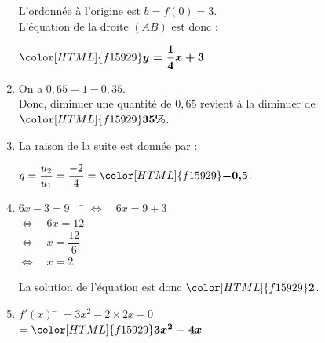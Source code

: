 \documentclass[a4paper,11pt,landscape,exos]{nsi} %
\begin{document}
\begin{multicols}{2}
\begin{enumerate}[]
\medskip
L'ordonnée à l'origine est $b=f(0)=3$.\\
L'équation de la droite $(AB)$ est donc :
\begin{center}
    $\color[HTML]{f15929}\boldsymbol{y=\dfrac{1}{4}x+3}$.
\end{center}
\item On a $0{,}65=1-0{,}35$.\\
    Donc, diminuer une quantité de $0{,}65$ revient à la diminuer de $\color[HTML]{f15929}\boldsymbol{35\%}$.
\item La raison de la suite est donnée par :
\begin{center}
    $q=\dfrac{u_2}{u_1}=\dfrac{-2}{4}=\color[HTML]{f15929}\boldsymbol{-0{,}5}$.
\end{center}
\item \begin{tabbing}
    $6x-3=9\quad$ \= $\iff \quad 6x=9+3$ \\
    \> $\iff \quad 6x=12$\\
    \> $\iff \quad x=\dfrac{12}{6}$\\
    \> $\iff \quad x=2$.
\end{tabbing}
La solution de l'équation est donc $\color[HTML]{f15929}\boldsymbol{2}$.
\item \begin{tabbing}
    $f'(x)$ \= $=3x^2-2\times 2x-0$\\
    \> $=\color[HTML]{f15929}\boldsymbol{3x^2-4x}$
\end{tabbing}

\vfill\null

\end{enumerate}

\end{multicols}
\end{document}
